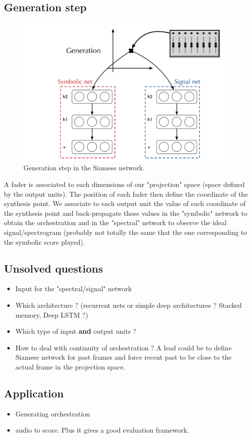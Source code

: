\documentclass{report}
\begin{document}
\subsection{Generation step}
\begin{figure}
\centering
\includegraphics[width=0.97\linewidth]{Ideas/Siamese_net/siamese_net_generation}
\caption{Generation step in the Siamese network.}
\end{figure}
A fader is associated to each dimensions of our "projection" space (space defined by the output units). The position of each fader then define the coordinate of the synthesis point. We associate to each output unit the value of each coordinate of the synthesis point and back-propagate those values in the "symbolic" network to obtain the orchestration and in the "spectral" network to observe the ideal signal/spectrogram (probably not totally the same that the one corresponding to the symbolic score played).

\subsection{Unsolved questions}
\begin{itemize}
\item Input for the "spectral/signal" network
\item Which architecture ? (recurrent nets or simple deep architectures ? Stacked memory, Deep LSTM ?)
\item Which type of input \textbf{and} output units ?
\item How to deal with continuity of orchestration ? A lead could be to define Siamese network for past frames and force recent past to be close to the actual frame in the projection space.
\end{itemize}

\subsection{Application}
\begin{itemize}
\item Generating orchestration
\item audio to score. Plus it gives a good evaluation framework.
\end{itemize}
\end{document}
